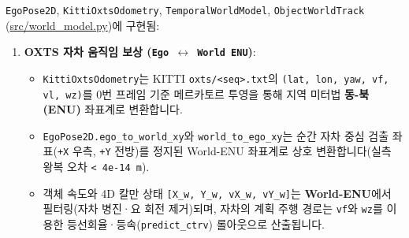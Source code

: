 \documentclass[10.5pt,a4paper]{article}
\begin{document}
\texttt{EgoPose2D}, \texttt{KittiOxtsOdometry}, \texttt{TemporalWorldModel}, \texttt{ObjectWorldTrack} (\href{https://github.com/Heisnotanimposter/Totalcare\_autonomous\_driving\_Yolov5/blob/main/src/world\_model.py}{src/world\_model.py})에 구현됨:


\begin{enumerate}[leftmargin=1.8em,itemsep=2pt]
\item \textbf{OXTS 자차 움직임 보상 (\texttt{Ego $\leftrightarrow$ World ENU})}:
\begin{itemize}[leftmargin=1.5em,itemsep=2pt]
\item \texttt{KittiOxtsOdometry}는 KITTI \texttt{oxts/\allowbreak{}<seq>.\allowbreak{}txt}의 \texttt{(lat,\allowbreak{} lon,\allowbreak{} yaw,\allowbreak{} vf,\allowbreak{} vl,\allowbreak{} wz)}를 0번 프레임 기준 메르카토르 투영을 통해 지역 미터법 \textbf{동-북(ENU)} 좌표계로 변환합니다.
\item \texttt{EgoPose2D.\allowbreak{}ego\_\allowbreak{}to\_\allowbreak{}world\_\allowbreak{}xy}와 \texttt{world\_\allowbreak{}to\_\allowbreak{}ego\_\allowbreak{}xy}는 순간 자차 중심 검출 좌표(\texttt{+X} 우측, \texttt{+Y} 전방)를 정지된 World-ENU 좌표계로 상호 변환합니다(실측 왕복 오차 \texttt{< 4e-\allowbreak{}14 m}).
\item 객체 속도와 4D 칼만 상태 \texttt{[X\_\allowbreak{}w,\allowbreak{} Y\_\allowbreak{}w,\allowbreak{} vX\_\allowbreak{}w,\allowbreak{} vY\_\allowbreak{}w]}는 \textbf{World-ENU}에서 필터링(자차 병진·요 회전 제거)되며, 자차의 계획 주행 경로는 \texttt{vf}와 \texttt{wz}를 이용한 등선회율·등속(\texttt{predict\_\allowbreak{}ctrv}) 롤아웃으로 산출됩니다.
\end{itemize}
\end{enumerate}
\end{document}
